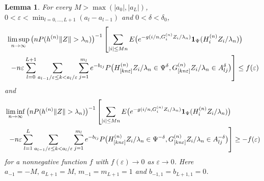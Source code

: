\documentclass[11pt,reqno]{amsart}
\numberwithin{equation}{section}
\newtheorem{lemma}{Lemma}[section] %
\theoremstyle{definition}
\theoremstyle{remark}
\theoremstyle{definition}
\newcommand{\eps}{\varepsilon}
\newcommand{\one}{{\bf 1}}
\begin{document}
\begin{lemma} \label{l:bounds}
For every $M> \max(|a_0|, |a_L|)$, 
$0<\eps<\min_{l=0,\ldots, L+1}(a_l-a_{l-1})$ and $0<\delta<\delta_0$, 
\begin{align} \label{e:block.upper}
  &\limsup_{n\to \infty} \, \bigl(n P(h^{(n)} \|Z\| > \lambda_
    n)\bigr)^{-1}\left[ \sum_{|i| 
          \leq Mn}E\bigl( e^{-g(i/n,    G_i^{(n)}Z_i/\lambda_n)}
  \one_{\Psi}(H_i^{(n)} Z_i/\lambda_n)\bigr) \right.\\
 \notag &\left. \hskip 0.05in - n\eps \sum_{l=0}^{L+1} \sum_{a_{l-1}/\eps\leq
                 k<a_l/\eps} \sum_{j=1}^{m_l} e^{-b_{lj}}P\bigl(
                 H_{[kn\eps]}^{(n)}Z_i/\lambda_n \in  \Psi^{\delta},  G_{[kn\eps]}^{(n)} Z_i/\lambda_n \in A_{lj}^\delta \bigr)\right] 
\leq f(\eps)  
  \end{align}
  and
\begin{align} \label{e:block.lower}
  &\liminf_{n\to \infty}  \, \bigl(n P(h^{(n)} \|Z\| > \lambda_
    n)\bigr)^{-1}\left[ \sum_{|i| 
          \leq Mn}E\bigl( e^{-g(i/n,    G_i^{(n)}Z_i/\lambda_n)}
  \one_{\Psi}(H_i^{(n)} Z_i/\lambda_n)\bigr) \right.\\
 \notag &\left. \hskip 0.05in - n\eps \sum_{l=1}^L \sum_{a_{l-1}/\eps\leq
                 k<a_l/\eps} \sum_{j=1}^{m_l} e^{-b_{lj}}P\bigl(
                 H_{[kn\eps]}^{(n)}Z_i/\lambda_n \in \Psi^{-\delta}, G_{[kn\eps]}^{(n)} Z_i /\lambda_n \in A_{lj}^{-\delta} \bigr)\right] 
\geq -f(\eps)  
  \end{align}
  for a nonnegative function $f$ with $f(\eps)\to 0$ as $\eps\to
  0$. Here $a_{-1}=-M, \, a_{L+1}=M, \, m_{-1}=m_{L+1}=1$ and
  $b_{-1,1}=b_{L+1,1}=0$. 
  \end{lemma}

\end{document}
